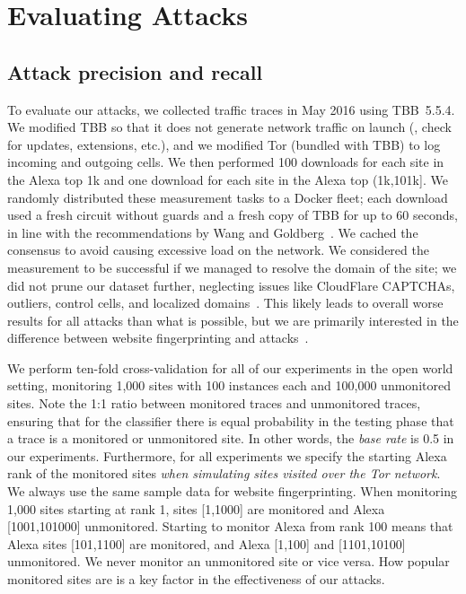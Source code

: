 \section{Evaluating \name Attacks}
\label{sec:analysis}

\subsection{Attack precision and recall}

To evaluate our \name attacks, we collected traffic traces in May
2016 using TBB~5.5.4.
We modified TBB so that it does not generate network traffic on launch
(\ie, check for
updates, extensions, etc.), and we modified
Tor (bundled with TBB) to log incoming and outgoing cells.
We then performed 100 downloads for each site in the Alexa top
1k and one download for each site in the
Alexa top (1k,101k]. We randomly distributed these measurement tasks
to a Docker fleet; each download used a fresh circuit without
guards and a fresh copy of TBB for up to 60 seconds,
in line with the recommendations by Wang and Goldberg~\cite{Wang2013a}.
We cached the consensus to avoid causing excessive load on the network.
We considered the measurement to be successful if we managed to resolve
the domain of the site;
we did not prune our dataset further, neglecting issues like CloudFlare
CAPTCHAs, outliers, control cells, and localized domains~\cite{Juarez2014a}.
This likely leads to overall worse results for all attacks than what is
possible, but we are primarily interested in the difference between website
fingerprinting and \name attacks~\cite{Wang2013a}.

We perform ten-fold cross-validation for all of our experiments in the open
world setting, monitoring 1,000 sites with 100 instances each and
100,000 unmonitored sites.
Note the 1:1 ratio between monitored traces and unmonitored traces,
ensuring that for the classifier there is equal probability in the testing
phase that a trace is a monitored or unmonitored site.
In other words, the \emph{base rate} is 0.5 in our experiments.
Furthermore, for all experiments we specify the starting Alexa rank of the
monitored sites
\emph{when simulating sites visited over the Tor network}.
We always use the same sample data for website fingerprinting.
When monitoring 1,000 sites starting at rank 1, sites
[1,1000] are monitored and Alexa [1001,101000] unmonitored. Starting to
monitor Alexa from rank 100 means that Alexa sites [101,1100] are monitored,
and Alexa [1,100] and [1101,10100] unmonitored.
We never monitor an unmonitored site or vice versa.
How popular monitored sites
are is a key factor in the effectiveness of our attacks.

